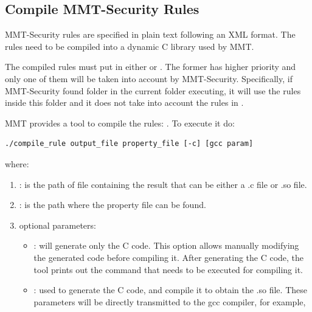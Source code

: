 

\subsection{Compile MMT-Security Rules}

MMT-Security rules are specified in plain text following an XML format. The rules need to be compiled into a dynamic C library used by MMT.

The compiled rules must put in either  or .
The former has higher priority and only one of them will be taken into account by MMT-Security.
Specifically, if MMT-Security found  folder in the current folder executing, it will use the rules inside this folder and
it does not take into account the rules in .

MMT provides a tool to compile the rules: . To execute it do:

\begin{lstlisting}[style=BASH]
./compile_rule output_file property_file [-c] [gcc param]
\end{lstlisting}

where:

\begin{enumerate}
\item {}: is the path of file containing the result that can be either a .c file or .so file.
\item {}: is the path where the property file can be found.
\item optional parameters: 
    \begin{itemize}
    \item {}: will generate only the C code. This option allows manually modifying the generated code before compiling it. 
    After generating the C code, the tool prints out the command that needs to be executed for compiling it.
    
    \item {}: used to generate the C code, and compile it to obtain the .so file.
                   These parameters will be directly transmitted to the gcc compiler, for example, 
    \end{itemize}
\end{enumerate}

